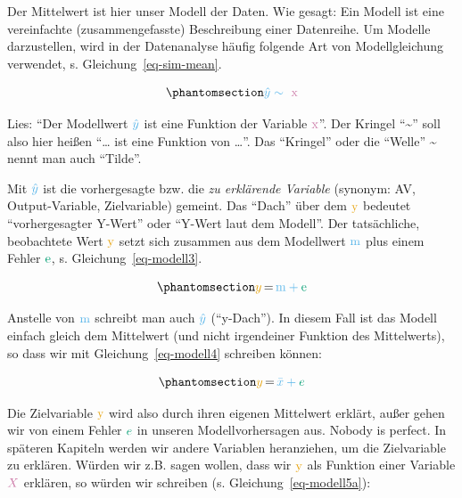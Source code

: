 \documentclass[
  letterpaper,
  twoside,
  open=any]{scrbook}
\theoremstyle{definition}
\theoremstyle{definition}
\theoremstyle{definition}
\theoremstyle{remark}
\begin{document}
Der Mittelwert ist hier unser Modell der Daten. Wie gesagt: Ein Modell
ist eine vereinfachte (zusammengefasste) Beschreibung einer Datenreihe.
Um Modelle darzustellen, wird in der Datenanalyse häufig folgende Art
von Modellgleichung verwendet, s. Gleichung~\ref{eq-sim-mean}.

\begin{equation}\phantomsection\label{eq-sim-mean}{\color{modelcol}{\hat{y}} \sim \color{xcol}{\text{ x}}}\end{equation}

Lies: \enquote{Der Modellwert \(\color{modelcol}{\hat{y}}\) ist eine
Funktion der Variable \(\color{xcol}{\text{x}}\)}. Der Kringel
\enquote{\textasciitilde{}} soll also hier heißen \enquote{\ldots{} ist
eine Funktion von \ldots{}}. Das \enquote{Kringel} oder die
\enquote{Welle} \textasciitilde{} nennt man auch \enquote{Tilde}.

Mit \(\color{modelcol}{\hat{y}}\) ist die vorhergesagte bzw. die
\emph{zu erklärende Variable} (synonym: AV, Output-Variable,
Zielvariable) gemeint. Das \enquote{Dach} über dem
\(\color{ycol}{\text{y}}\) bedeutet \enquote{vorhergesagter Y-Wert} oder
\enquote{Y-Wert laut dem Modell}. Der tatsächliche, beobachtete Wert
\(\color{ycol}{\text{y}}\) setzt sich zusammen aus dem Modellwert
\(\color{modelcol}{\text{m}}\) plus einem Fehler
\(\color{errorcol}{\text{e}}\), s. Gleichung~\ref{eq-modell3}.

\begin{equation}\phantomsection\label{eq-modell3}{\color{ycol}{y} \color{black}{\, = \,} \color{modelcol}{\text{m}} + \color{errorcol}{\text{e}}}\end{equation}

Anstelle von \(\color{modelcol}{\text{m}}\) schreibt man auch
\(\color{modelcol}{\hat{y}}\) (\enquote{y-Dach}). In diesem Fall ist das
Modell einfach gleich dem Mittelwert (und nicht irgendeiner Funktion des
Mittelwerts), so dass wir mit Gleichung~\ref{eq-modell4} schreiben
können:

\begin{equation}\phantomsection\label{eq-modell4}{\color{ycol}{y}  \color{black}{\, =\, } \color{modelcol}{\bar{x}} + \color{errorcol}{e}}\end{equation}

Die Zielvariable \(\color{ycol}{\text{y}}\) wird also durch ihren
eigenen Mittelwert erklärt, außer gehen wir von einem Fehler
\(\color{errorcol}e\) in unseren Modellvorhersagen aus. Nobody is
perfect. In späteren Kapiteln werden wir andere Variablen heranziehen,
um die Zielvariable zu erklären. Würden wir z.B. sagen wollen, dass wir
\(\color{ycol}{\text{y}}\) als Funktion einer Variable
\(\color{xcol}{X}\) erklären, so würden wir schreiben (s.
Gleichung~\ref{eq-modell5a}):
\end{document}
